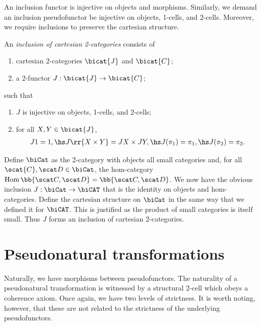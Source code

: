 An inclusion functor is injective on objects and morphisms. Similarly, we demand an
inclusion pseudofunctor be injective on objects, 1-cells, and 2-cells. Moreover,
we require inclusions to preserve the cartesian structure.

\begin{definition}
  An \emph{inclusion of cartesian 2-categories} consists of
  \begin{enumerate}
    \item cartesian 2-categories $\bicat{J}$ and $\bicat{C}$;
    \item a 2-functor $J:\bicat{J}\to\bicat{C}$;
  \end{enumerate}
  such that
  \begin{enumerate}
    \item $J$ is injective on objects, 1-cells, and 2-cells;
    \item for all $X,Y\in\bicat{J}$,
      \begin{align*}
        J1=1,\hs
        J\rr{X\times Y}=JX\times JY,\hs
        J(\pi_1) = \pi_1,\hs J(\pi_2)=\pi_2.
      \end{align*}
  \end{enumerate}
\end{definition}

\begin{example}
  Define $\biCat$ as the 2-category with objects all small categories and, for all
  $\scat{C},\scat D\in\biCat$, the hom-category $\Hom\bb{\scat C,\scat D}=\bb{\scat C,\scat D}$.
  We now have the obvious inclusion $J:\biCat\to\biCAT$ that is the identity
  on objects and hom-categories. Define the cartesian structure
  on $\biCat$ in the same way that we defined it for $\biCAT$. This is justified as the
  product of small categories is itself small. Thus $J$ forms an inclusion of cartesian
  2-categories.
\end{example}

\section{Pseudonatural transformations}

Naturally, we have morphisms between pseudofunctors. The naturality of a
pseudonatural transformation is witnessed by a structural 2-cell which obeys a
coherence axiom. Once again, we have two levels of strictness. It is worth
noting, however, that these are not related to the strictness of the underlying
pseudofunctors.

